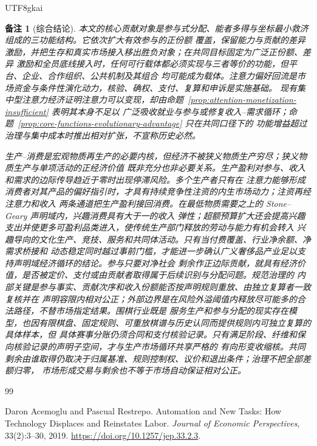 \documentclass[12pt,a4paper,openany]{report}
\renewcommand{\bibname}{参考文献}
\newtheorem{remark}{备注}[chapter]
\begin{document}
\begin{CJK*}{UTF8}{gkai}
\begin{remark}[综合结论]
本文的核心贡献对象是参与式分配、能者多得与坐标最小救济组成的三功能结构。它依次扩大有效参与的正份额
覆盖，保留能力与贡献的差异激励，并把生存和真实市场接入移出胜负对象；在共同目标固定为广泛正份额、差异
激励和全员底线接入时，任何可行载体都必须实现与三者等价的功能，但平台、企业、合作组织、公共机制及其组合
均可能成为载体。注意力偏好回流是市场资金与条件性演化动力，核验、确权、支付、复算和申诉是实施基础。
现有集中型注意力经济证明注意力可以变现，却由命题~\ref{prop:attention-monetization-insufficient} 表明其本身不足以
广泛吸收就业与参与或修复收入--需求循环；命题~\ref{prop:core-functions-evolutionary-advantage} 只在共同口径下的
功能增益超过治理与集中成本时推出相对扩张，不宣称历史必然。

生产--消费是宏观物质再生产的必要内核，但经济不被狭义物质生产穷尽；狭义物质生产与单项活动的正经济价值
既非充分也非必要关系。生产盈利对参与、收入和需求的边际传导趋近于零时出现停滞风险。多个生产者只有在
注意力能够形成消费者对其产品的偏好指引时，才具有持续竞争性注资的内生市场动力；注资再经注意力和收入
两条通道把生产盈利接回消费。在最低物质需要之上的 Stone--Geary 声明域内，兴趣消费具有大于一的收入
弹性；超额预算扩大还会提高兴趣支出并使更多可盈利品类进入，使传统生产部门释放的劳动与能力有机会转入
兴趣导向的文化生产、竞技、服务和共同体活动。只有当付费覆盖、行业净余额、净需求桥接和
动态稳定同时越过事前门槛，才能进一步确认广义奢侈品产业足以支持声明域经济循环的结论。参与只要对净社会
剩余作正边际贡献，就具有经济价值，是否被定价、支付或由贡献者取得属于后续识别与分配问题。规范治理的
内部关键是参与事实、贡献次序和收入份额能否按声明规则重放、由独立复算者一致复核并在
声明容限内相对公正；外部边界是在风险外溢阈值内释放尽可能多的合法路径，不替市场指定结果。围棋行业既是
服务生产和参与分配的现实存在模型，也因有限棋盘、固定规则、可重放棋谱与历史认同而提供规则内可独立复算的
具体样本，但
具体赛事分账仍须合同和支付核验记录。只有满足阶段、纤维和保向核验记录的声明子空间，才与生产市场循环共享严格的
有向形变收缩核。共同剩余由谁取得仍取决于归属基准、规则控制权、议价和退出条件；治理不把全部差额归零，
市场形成交易与剩余也不等于市场自动保证相对公正。
\end{remark}

\clearpage

\clearpage
\begin{thebibliography}{99}
\addcontentsline{toc}{chapter}{\bibname}

Daron Acemoglu and Pascual Restrepo.
\newblock Automation and New Tasks: How Technology Displaces and Reinstates Labor.
\newblock \emph{Journal of Economic Perspectives}, 33(2):3--30, 2019.
\newblock \url{https://doi.org/10.1257/jep.33.2.3}.


\end{thebibliography}
\end{CJK*}
\end{document}
